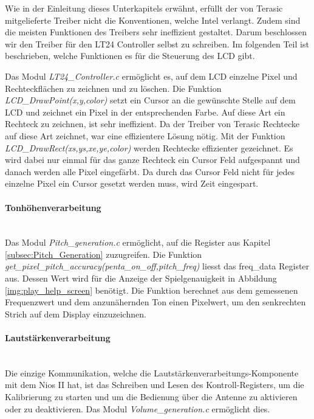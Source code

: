 Wie in der Einleitung dieses Unterkapitels erwähnt, erfüllt der von Terasic mitgelieferte Treiber nicht die Konventionen, welche Intel verlangt. Zudem sind die meisten Funktionen des Treibers sehr ineffizient gestaltet. Darum beschlossen wir den Treiber für den LT24 Controller selbst zu schreiben. Im folgenden Teil ist beschrieben, welche Funktionen es für die Steuerung des LCD gibt.

Das Modul \textit{LT24\_Controller.c} ermöglicht es, auf dem LCD einzelne Pixel und Rechteckflächen zu zeichnen und zu löschen. Die Funktion \textit{LCD\_DrawPoint(x,y,color)} setzt ein Cursor an die gewünschte Stelle auf dem LCD und zeichnet ein Pixel in der entsprechenden Farbe. Auf diese Art ein Rechteck zu zeichnen, ist sehr ineffizient. Da der Treiber von Terasic Rechtecke auf diese Art zeichnet, war eine effizientere Lösung nötig. Mit der Funktion \textit{LCD\_DrawRect(xs,ys,xe,ye,color)} werden Rechtecke effizienter gezeichnet. Es wird dabei nur einmal für das ganze Rechteck ein Cursor Feld aufgespannt und danach werden alle Pixel eingefärbt. Da durch das Cursor Feld nicht für jedes einzelne Pixel ein Cursor gesetzt werden muss, wird Zeit eingespart. 

\paragraph{Tonhöhenverarbeitung}\mbox{}\\

Das Modul \textit{Pitch\_generation.c} ermöglicht, auf die Register aus Kapitel \ref{subsec:Pitch_Generation} zuzugreifen.
Die Funktion \textit{get\_pixel\_pitch\_accuracy(penta\_on\_off,pitch\_freq)} liesst das freq\_data Register aus. Dessen Wert wird für die Anzeige der Spielgenauigkeit in Abbildung \ref{img:play_help_screen} benötigt. Die Funktion berechnet aus dem gemessenen Frequenzwert und dem anzunähernden Ton einen Pixelwert, um den senkrechten Strich auf dem Display einzuzeichnen.


\paragraph{Lautstärkenverarbeitung}\mbox{}\\

Die einzige Kommunikation, welche die Lautstärkenverarbeitungs-Komponente mit dem Nios II hat, ist das Schreiben und Lesen des Kontroll-Registers, um die Kalibrierung zu starten und um die Bedienung über die Antenne zu aktivieren oder zu deaktivieren. Das Modul \textit{Volume\_generation.c} ermöglicht dies. 